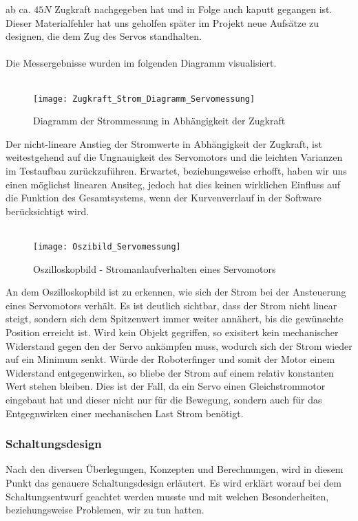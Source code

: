 \documentclass[titlepage,12pt,twoside]{article}
\begin{document}
ab ca. $45N$ Zugkraft nachgegeben hat und in Folge auch kaputt gegangen ist. Dieser Materialfehler hat uns geholfen später im
Projekt neue Aufsätze zu designen, die dem Zug des Servos standhalten. \\
\\
Die Messergebnisse wurden im folgenden Diagramm visualisiert. \\
\\
\begin{figure}[H]
	\begin{center}
		\scalebox{1.0}
		{\texttt{[image: Zugkraft\_Strom\_Diagramm\_Servomessung]}}
		\caption{Diagramm der Strommessung in Abhängigkeit der Zugkraft}
		\label{fig:Zugkraft_Strom_Diagramm_Servomessung}	
	\end{center}
\end{figure}
\hfill \break
Der nicht-lineare Anstieg der Stromwerte in Abhängigkeit der Zugkraft, ist weitestgehend auf die Ungnauigkeit des Servomotors
und die leichten Varianzen im Testaufbau zurückzuführen. Erwartet, beziehungsweise erhofft, haben wir uns einen möglichst linearen
Ansiteg, jedoch hat dies keinen wirklichen Einfluss auf die Funktion des Gesamtsystems, wenn der Kurvenverrlauf in der Software
berücksichtigt wird. \\
\\
\begin{figure}[H]
	\begin{center}
		\scalebox{0.8}
		{\texttt{[image: Oszibild\_Servomessung]}}
		\caption{Oszilloskopbild - Stromanlaufverhalten eines Servomotors}
		\label{fig:Oszibild_Servomessung}	
	\end{center}
\end{figure}
\hfill \break
An dem Oszilloskopbild ist zu erkennen, wie sich der Strom bei der Ansteuerung eines Servomotors verhält. Es ist deutlich sichtbar,
dass der Strom nicht linear steigt, sondern sich dem Spitzenwert immer weiter annähert, bis die gewünschte Position erreicht ist.
Wird kein Objekt gegriffen, so exisitert kein mechanischer Widerstand gegen den der Servo ankämpfen muss, wodurch sich der Strom
wieder auf ein Minimum senkt. Würde der Roboterfinger und somit der Motor einem Widerstand entgegenwirken, so bliebe der Strom auf
einem relativ konstanten Wert stehen bleiben. Dies ist der Fall, da ein Servo einen Gleichstrommotor eingebaut hat und dieser nicht 
nur für die Bewegung, sondern auch für das Entgegnwirken einer mechanischen Last Strom benötigt. 
\newpage
\subsubsection{Schaltungsdesign}
\label{chap:Schaltungsdesign_Roboterhand}
Nach den diversen Überlegungen, Konzepten und Berechnungen, wird in diesem Punkt das genauere Schaltungsdesign erläutert. Es wird
erklärt worauf bei dem Schaltungsentwurf geachtet werden musste und mit welchen Besonderheiten, beziehungsweise Problemen, wir zu
tun hatten. 
\end{document}
